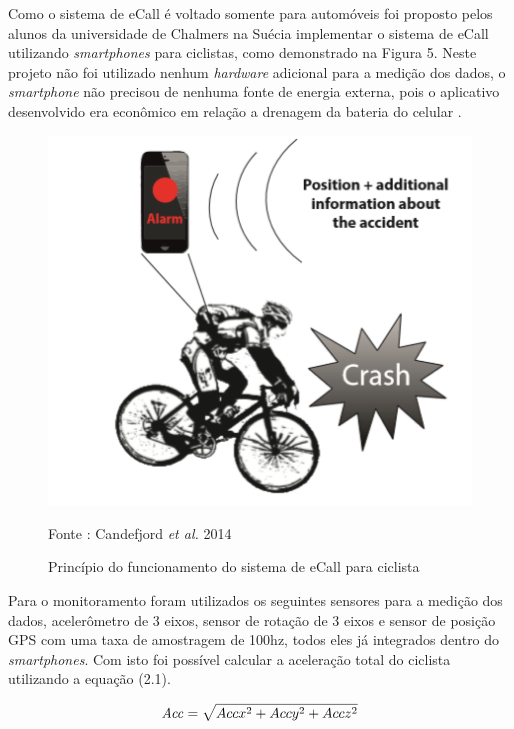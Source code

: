 Como o sistema de eCall é voltado somente para automóveis foi proposto pelos alunos da universidade de Chalmers na Suécia  implementar o sistema de eCall utilizando  \textit{smartphones} para ciclistas, como demonstrado na Figura 5.  Neste projeto não foi utilizado nenhum \textit{hardware} adicional para a medição dos dados, o \textit{smartphone} não precisou de nenhuma fonte de energia externa, pois o aplicativo desenvolvido era econômico em relação a drenagem da bateria do celular  .




 \begin{figure}[H]

 \caption{Princípio do funcionamento do sistema de eCall para ciclista}
  \includegraphics[width=150mm]{images/Cap2/images.png}
 
  \scriptsize Fonte : Candefjord \textit{et al.} 2014
  
\end{figure}

    



Para o monitoramento foram utilizados os seguintes sensores para a medição dos dados, acelerômetro de 3 eixos, sensor de rotação de 3 eixos e sensor de posição GPS com uma taxa de amostragem de 100hz, todos eles já integrados dentro do \textit{smartphones}. Com isto foi possível calcular a aceleração total do ciclista utilizando a equação (2.1).


\begin{equation}
\centering
    \mathit{Acc} = \sqrt{Accx^2 + Accy^2 + Accz^2}
\end{equation}


